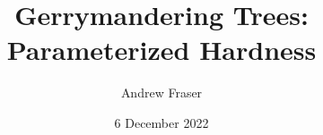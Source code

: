 \documentclass[table]{beamer}
\title{Gerrymandering Trees: Parameterized Hardness}
\author{Andrew Fraser}
\date{6 December 2022}
\begin{document}
	\begin{frame}
		\titlepage
	\end{frame}

	
	
	
	
\end{document}
